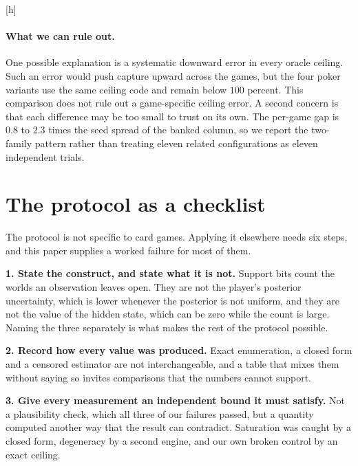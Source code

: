 \documentclass{article}
\makeatletter
\renewenvironment{table}
{\setlength{\abovecaptionskip}{10\p@}%
   \setlength{\belowcaptionskip}{\z@}%
\@float{table}} {\end@float}
\makeatother
\begin{document}
\begin{table}[h]
  \centering \small
  
  \caption{How far each arm sits below its own exact ceiling, sorted by capture. The difference column is $g_b - g_o$, which Equation~\eqref{eq:identity} makes equal to banked minus worth. It changes sign exactly where capture crosses $100$ percent, by construction.}
  \label{tab:app-gaps}
\end{table}

\paragraph{What we can rule out.} One possible explanation is a systematic downward error in every oracle ceiling. Such an error would push capture upward across the games, but the four poker variants use the same ceiling code and remain below $100$ percent. This comparison does not rule out a game-specific ceiling error. A second concern is that each difference may be too small to trust on its own. The per-game gap is $0.8$ to $2.3$ times the seed spread of the banked column, so we report the two-family pattern rather than treating eleven related configurations as eleven independent trials.

\section{The protocol as a checklist}
\label{app:checklist}

The protocol is not specific to card games. Applying it elsewhere needs six steps, and this paper supplies a worked failure for most of them.

\textbf{1. State the construct, and state what it is not.} Support bits count the worlds an observation leaves open. They are not the player's posterior uncertainty, which is lower whenever the posterior is not uniform, and they are not the value of the hidden state, which can be zero while the count is large. Naming the three separately is what makes the rest of the protocol possible.

\textbf{2. Record how every value was produced.} Exact enumeration, a closed form and a censored estimator are not interchangeable, and a table that mixes them without saying so invites comparisons that the numbers cannot support.

\textbf{3. Give every measurement an independent bound it must satisfy.} Not a plausibility check, which all three of our failures passed, but a quantity computed another way that the result can contradict. Saturation was caught by a closed form, degeneracy by a second engine, and our own broken control by an exact ceiling.
\end{document}
